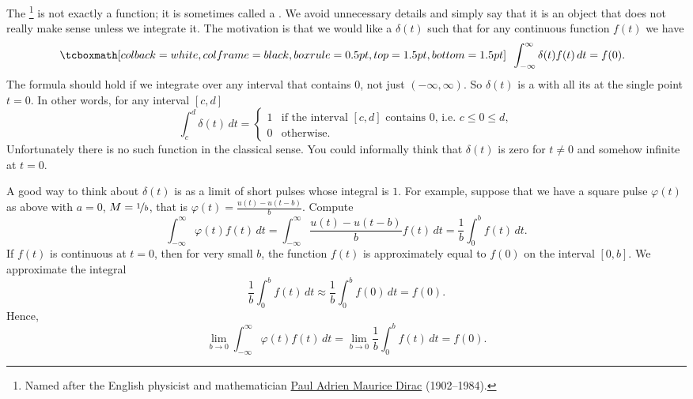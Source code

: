 The \emph{}%
\footnote{Named after the English physicist and mathematician
\href{https://en.wikipedia.org/wiki/Paul_Dirac}{Paul Adrien Maurice Dirac}
(1902--1984).}
is not exactly a function; it is sometimes called a
\emph{}.  We
avoid unnecessary details and simply say that it is an object
that does not really make sense unless we integrate it.  The motivation is
that we would like a  $\delta(t)$
such that 
for any continuous function $f(t)$ we have
\begin{equation*}
\mybxbg{~~
\int_{-\infty}^\infty \delta(t) f(t) \,dt = f(0) .
~~}
\end{equation*}
The formula should hold if we integrate over any interval that contains 0,
not just $(-\infty,\infty)$.
So $\delta(t)$ is a  
with all its  at the single point $t=0$.  In other words, for any
interval $[c,d]$
\begin{equation*}
\int_c^d \delta(t) \,dt = 
\begin{cases}
1 & \text{if the interval $[c,d]$ contains 0, i.e.\ } c \leq 0 \leq d, \\
0 & \text{otherwise.}
\end{cases}
\end{equation*}
Unfortunately there is no such function in the classical sense.  You could
informally think that $\delta(t)$ is zero for $t\not=0$ and somehow
infinite at $t=0$.

A good way to think about $\delta(t)$ is as a limit of short pulses
whose integral is $1$.  For example, suppose that
we have a square pulse $\varphi(t)$ as above with $a=0$,
$M=\nicefrac{1}{b}$, that is $\varphi(t) = \frac{u(t) - u(t-b)}{b}$.
Compute
\begin{equation*}
\int_{-\infty}^\infty \varphi(t) f(t) \,dt =
\int_{-\infty}^\infty \frac{u(t) - u(t-b)}{b} f(t) \,dt =
\frac{1}{b} \int_{0}^b f(t) \,dt .
\end{equation*}
If $f(t)$ is continuous at $t=0$, then
for very small $b$, the function $f(t)$ is approximately equal to $f(0)$ on
the interval $[0,b]$.  We approximate the integral
\begin{equation*}
\frac{1}{b} \int_{0}^b f(t) \,dt \approx
\frac{1}{b} \int_{0}^b f(0) \,dt = f(0) .
\end{equation*}
Hence,
\begin{equation*}
\lim_{b\to 0}
\int_{-\infty}^\infty \varphi(t) f(t) \,dt =
\lim_{b\to 0}
\frac{1}{b} \int_{0}^b f(t) \,dt  = f(0) .
\end{equation*}

